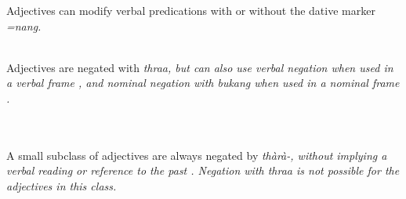 Adjectives can modify verbal predications with or without the dative marker \em =nang\em.

 \\
% 



Adjectives are negated with \em thraa\em {}, but can also use verbal negation when used in a verbal frame , and nominal negation with \em bukang \em when used in a nominal frame \citep[141]{Slomanson2007cll}.

 \\

 \\

A small subclass of adjectives are always negated by \em thàrà-\em, without implying a verbal reading or reference to the past . Negation with \em thraa \em is not possible for the adjectives in this class.

\\





